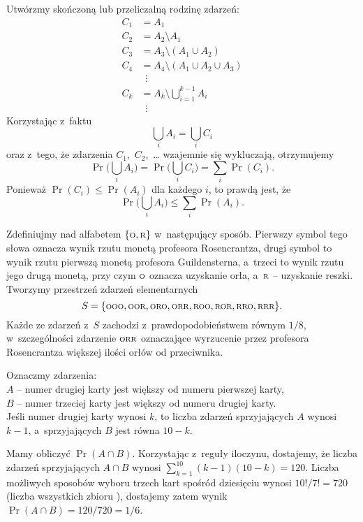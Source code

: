 
\exercise{} %
Utwórzmy skończoną lub przeliczalną rodzinę zdarzeń:
\begin{align*}
	C_1 &= A_1 \\
	C_2 &= A_2\setminus A_1 \\
	C_3 &= A_3\setminus(A_1\cup A_2) \\
	C_4 &= A_4\setminus(A_1\cup A_2\cup A_3) \\
	& \,\,\,\vdots \\
	C_k &= A_k\setminus\bigcup_{i=1}^{k-1}A_i \\
	& \,\,\,\vdots
\end{align*}
Korzystając z~faktu
\[
	\bigcup_iA_i = \bigcup_iC_i
\]
oraz z~tego, że zdarzenia $C_1$,~$C_2$,~\dots{} wzajemnie się wykluczają, otrzymujemy
\[
	\Pr\biggl(\bigcup_iA_i\biggr) = \Pr\biggl(\bigcup_iC_i\biggr) = \sum_i\Pr(C_i).
\]
Ponieważ $\Pr(C_i)\le\Pr(A_i)$ dla każdego $i$, to prawdą jest, że
\[
	\Pr\biggl(\bigcup_iA_i\biggr) \le \sum_i\Pr(A_i).
\]

\exercise{} %
Zdefiniujmy  nad alfabetem $\{{\scriptstyle\rm O},{\scriptstyle\rm R}\}$ w~następujący sposób. Pierwszy symbol tego słowa oznacza wynik rzutu monetą profesora Rosencrantza, drugi symbol to wynik rzutu pierwszą monetą profesora Guildensterna, a~trzeci to wynik rzutu jego drugą monetą, przy czym $\scriptstyle\rm O$ oznacza uzyskanie orła, a~$\scriptstyle\rm R$ -- uzyskanie reszki. Tworzymy przestrzeń zdarzeń elementarnych
\[
	S = \{{\scriptstyle\rm OOO},{\scriptstyle\rm OOR},{\scriptstyle\rm ORO},{\scriptstyle\rm ORR},{\scriptstyle\rm ROO},{\scriptstyle\rm ROR},{\scriptstyle\rm RRO},{\scriptstyle\rm RRR}\}.
\]
Każde ze zdarzeń z~$S$ zachodzi z~prawdopodobieństwem równym $1/8$, w~szczególności zdarzenie $\scriptstyle\rm ORR$ oznaczające wyrzucenie przez profesora Rosencrantza większej ilości orłów od przeciwnika.

\exercise{} %
Oznaczmy zdarzenia: \\
\hspace*\parindent$A$ -- numer drugiej karty jest większy od numeru pierwszej karty, \\
\hspace*\parindent$B$ -- numer trzeciej karty jest większy od numeru drugiej karty. \\
Jeśli numer drugiej karty wynosi $k$, to liczba zdarzeń sprzyjających $A$ wynosi $k-1$, a~sprzyjających $B$ jest równa $10-k$.

Mamy obliczyć $\Pr(A\cap B)$. Korzystając z~reguły iloczynu, dostajemy, że liczba zdarzeń sprzyjających $A\cap B$ wynosi $\sum_{k=1}^{10}(k-1)(10-k)=120$. Liczba możliwych sposobów wyboru trzech kart spośród dziesięciu wynosi $10!/7!=720$ (liczba wszystkich  zbioru ), dostajemy zatem wynik $\Pr(A\cap B)=120/720=1/6$.

